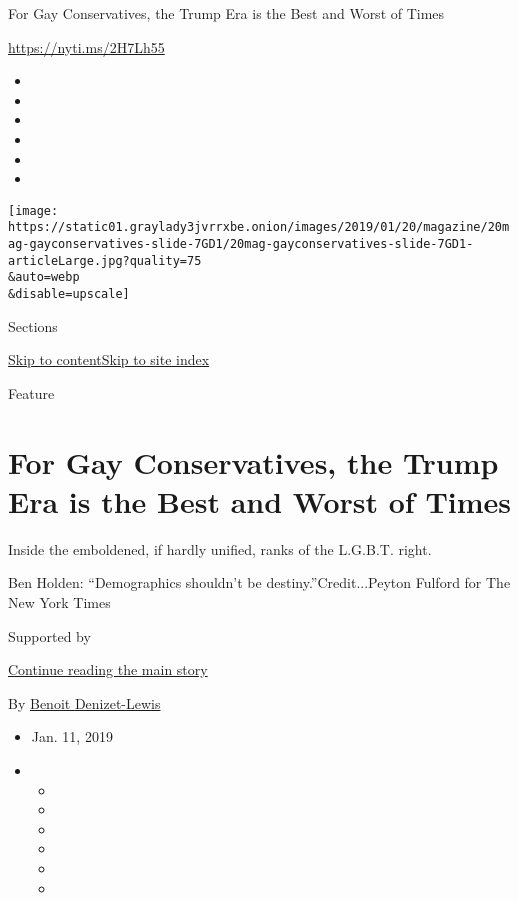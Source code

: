 For Gay Conservatives, the Trump Era is the Best and Worst of Times

\url{https://nyti.ms/2H7Lh55}

\begin{itemize}
\item
\item
\item
\item
\item
\item
\end{itemize}

\texttt{[image: https://static01.graylady3jvrrxbe.onion/images/2019/01/20/magazine/20mag-gayconservatives-slide-7GD1/20mag-gayconservatives-slide-7GD1-articleLarge.jpg?quality=75\\\&auto=webp\\\&disable=upscale]}

Sections

\protect\hyperlink{site-content}{Skip to
content}\protect\hyperlink{site-index}{Skip to site index}

Feature

\hypertarget{for-gay-conservatives-the-trump-era-is-the-best-and-worst-of-times}{%
\section{For Gay Conservatives, the Trump Era is the Best and Worst of
Times}\label{for-gay-conservatives-the-trump-era-is-the-best-and-worst-of-times}}

Inside the emboldened, if hardly unified, ranks of the L.G.B.T. right.

Ben Holden: ``Demographics shouldn't be destiny.''Credit...Peyton
Fulford for The New York Times

Supported by

\protect\hyperlink{after-sponsor}{Continue reading the main story}

By
\href{https://www.nytimes3xbfgragh.onion/by/benoit-denizet-lewis}{Benoit
Denizet-Lewis}

\begin{itemize}
\item
  Jan. 11, 2019
\item
  \begin{itemize}
  \item
  \item
  \item
  \item
  \item
  \item
  \end{itemize}
\end{itemize}

